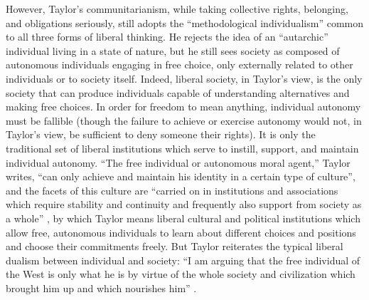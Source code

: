 \documentclass[12pt,oneside]{memoir}
\begin{document}
	However, Taylor's communitarianism, while taking collective rights, belonging, and obligations seriously, still adopts the ``methodological individualism'' common to all three forms of liberal thinking. He rejects the idea of an ``autarchic'' individual living in a state of nature, but he still sees society as composed of autonomous individuals engaging in free choice, only externally related to other individuals or to society itself. Indeed, liberal society, in Taylor's view, is the only society that can produce individuals capable of understanding alternatives and making free choices. In order for freedom to mean anything, individual autonomy must be fallible (though the failure to achieve or exercise autonomy would not, in Taylor's view, be sufficient to deny someone their rights). It is only the traditional set of liberal institutions which serve to instill, support, and maintain individual autonomy. ``The free individual or autonomous moral agent,'' Taylor writes, ``can only achieve and maintain his identity in a certain type of culture'', and the facets of this culture are ``carried on in institutions and associations which require stability and continuity and frequently also support from society as a whole'' \citep[205]{Taylor1985}, by which Taylor means liberal cultural and political institutions which allow free, autonomous individuals to learn about different choices and positions and choose their commitments freely. But Taylor reiterates the typical liberal dualism between individual and society: ``I am arguing that the free individual of the West is only what he is by virtue of the whole society and civilization which brought him up and which nourishes him'' \citep[206]{Taylor1985}. 
	
\end{document}
